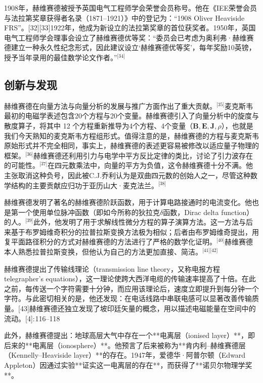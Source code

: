 1908年，赫维赛德被授予英国电气工程师学会荣誉会员称号。他在《IEE荣誉会员与法拉第奖章获得者名录（1871–1921）》中的登记为：“1908 Oliver Heaviside FRS”。[32][33]1922年，他成为新设立的法拉第奖章的首位获奖者。1950年，英国电气工程师学会理事会设立了赫维赛德优等奖：“委员会已考虑为奥利弗·赫维赛德建立一种永久性纪念形式，因此建议设立‘赫维赛德优等奖’，每年奖励10英镑，授予当年录用的最佳数学论文作者。”\(^\text{[34]}\)
\subsection{创新与发现}
赫维赛德在向量方法与向量分析的发展与推广方面作出了重大贡献。\(^\text{[35]}\)麦克斯韦最初的电磁学表述包含20个方程与20个变量。赫维赛德引入了向量分析中的旋度与散度算子，将其中 12 个方程重新推导为4个方程、4个变量（$\mathbf{B}, \mathbf{E}, \mathbf{J}, \rho$），也就是我们今天熟知的麦克斯韦方程组形式。值得注意的是，赫维赛德的方程与麦克斯韦原始形式并不完全相同，事实上，赫维赛德的表述更容易被修改以适应量子物理的框架。\(^\text{[36]}\)赫维赛德还利用引力与电学中平方反比定律的类比，讨论了引力波存在的可能性。\(^\text{[37]}\)在四元数乘法中，向量的平方为负值，这令赫维赛德十分不满。他主张取消这种负号，因此被C.J.乔利认为是双曲四元数的创始人之一，尽管这种数学结构的主要贡献应归功于亚历山大·麦克法兰。\(^\text{[38]}\)

赫维赛德发明了著名的赫维赛德阶跃函数，用于计算电路接通时的电流变化。他也是第一个使用单位脉冲函数（即如今所称的狄拉克$\delta$函数，Dirac delta function）的人。\(^\text{[39]}\)此外，他发明了用于求解线性微分方程的算子演算方法。这一方法与后来基于布罗姆维奇积分的拉普拉斯变换方法极为相似；后者由布罗姆维奇提出，用复平面路径积分的方式对赫维赛德的方法进行了严格的数学化证明。\(^\text{[40]}\)赫维赛德本人熟悉拉普拉斯变换，但他认为自己的方法更加直接、简洁。\(^\text{[41][42]}\)

赫维赛德提出了传输线理论（transmission line theory，又称电报方程telegrapher’s equations），这一理论使跨大西洋电缆的传输速率提高了十倍。在此之前，每传送一个字符需要十分钟，而应用该理论后，速度立即提升到每分钟一个字符。与此密切相关的是，他还发现：在电话线路中串联电感可以显著改善传输质量。[43]赫维赛德还独立发现了坡印廷矢量的概念，用以描述电磁能量在空间中的流动。[4]: 116–118 

此外，赫维赛德提出：地球高层大气中存在一个**电离层（ionised layer）**，即后来的**电离层（ionosphere）**。他预言了后来被称为**肯内利–赫维赛德层（Kennelly–Heaviside layer）**的存在。1947年，爱德华·阿普尔顿（Edward Appleton）因通过实验**证实这一电离层的存在**，而获得了**诺贝尔物理学奖**。
